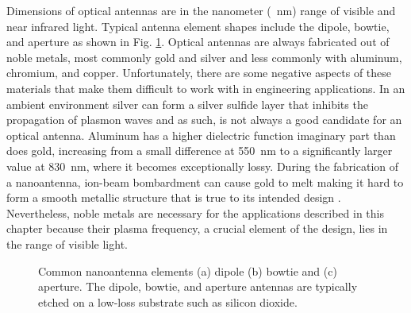 \documentclass[11pt]{article}
\begin{document}
Dimensions of optical antennas are in the nanometer (\SI{}{\nm}) range of visible and near infrared light. Typical antenna element shapes include the dipole, bowtie, and aperture as shown in Fig. \ref{fig:antennas}. Optical antennas are always fabricated out of noble metals, most commonly gold and silver and less commonly with aluminum, chromium, and copper. Unfortunately, there are some negative aspects of these materials that make them difficult to work with in engineering applications. In an ambient environment silver can form a silver sulfide layer that inhibits the propagation of plasmon waves \cite{Nevels2014} and as such, is not always a good candidate for an optical antenna. Aluminum has a higher dielectric function imaginary part than does gold, increasing from a small
difference at \SI{550}{\nm} to a significantly larger value at \SI{830}{\nm}, where it becomes exceptionally lossy. During the fabrication of a nanoantenna, ion-beam bombardment can cause gold to melt making it hard to form a smooth metallic structure that is true to its intended design \cite{farahani}. Nevertheless, noble metals are necessary for the applications described in this chapter because their plasma frequency, a crucial element of the design, lies in the range of visible light.
%
\begin{figure}[h!]
   \hfil
   \hfil
  \caption{Common nanoantenna elements (a) dipole (b) bowtie and (c) aperture. The dipole, bowtie, and aperture antennas are typically etched on a low-loss substrate such as silicon dioxide.}
  \label{fig:antennas}
\end{figure}
%
\end{document}
